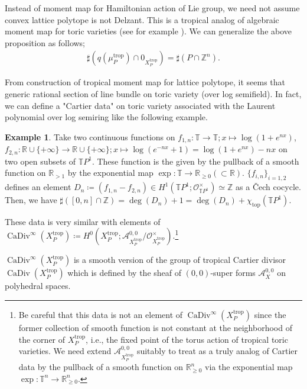 \documentclass[a4paper,dvipdfmx,reqno,12pt]{amsart}
\theoremstyle{definition}
\newtheorem{Eg}[Thm]{Example}
\newcommand{\deq}{\coloneqq}
\newcommand{\R}{\mathbb{R}}%
\newcommand{\Z}{\mathbb{Z}}%
\newcommand{\mb}[1]{\mathbb{#1}}%
\newcommand{\mcal}[1]{\mathcal{#1}}%
\newcommand{\opn}[1]{\operatorname{#1}}
\numberwithin{equation}{section}
\begin{document}
Instead of moment map for Hamiltonian action of Lie group, we
need not assume convex lattice polytope is not Delzant.
This is a tropical analog of algebraic moment map 
for toric varieties
(see for example
\cite[]{coxToricVarieties2011a}).
We can generalize the above proposition as follows;
\begin{align}
\sharp (q(\mu_P^{\opn{trop}}) \cap 0_{X_P^{\opn{trop}}})
=\sharp (P \cap \Z^{n}).
\end{align}

From construction of tropical moment map for lattice polytope,
it seems that generic rational section of line bundle on 
toric variety (over log semifield).
In fact, we can define a "Cartier data" on toric variety
associated with the Laurent polynomial over log semiring like 
the following example. 
\begin{Eg} \label{eg: TP1Cartier}
Take two continuous functions on 
$f_{1,n}\colon \mb{T}\to \mb{T};x \mapsto \log (1+e^{nx})$,
$f_{2,n}\colon \mb{R}\cup\{+\infty\}\to \mb{R}\cup\{+\infty\};
x\mapsto \log(e^{-nx}+1)=\log(1+e^{nx})-nx$ on two open 
subsets of $\mb{T}P^{1}$. These function is the given 
by the pullback of a smooth function on $\R_{>1}$ by the 
exponential map $\opn{exp}:\mb{T}\to \R_{\geq 0} (\subset \R)$.
$\{f_{i,n}\}_{i=1,2}$ defines an element 
$D_n\deq (f_{1,n}-f_{2,n})\in 
H^{1}(\mb{T}P^1;\mcal{O}_{\mb{T}P^1}^{\times})\simeq \Z$
as a \v{C}ech cocycle.
Then, we have 
$\sharp([0,n]\cap \Z)=\opn{deg}(D_n)+1=\opn{deg}(D_n)+\chi_{\opn{top}}(\mb{T}P^1)$.
\end{Eg}


These data is very similar with elements of 
$\opn{CaDiv}^{\infty}(X_{P}^{\opn{trop}})\deq H^{0}(X_{P}^{\opn{trop}};
\mcal{A}^{0,0}_{X_{P}^{\opn{trop}}}/
\mathcal{O}^{\times}_{X_{P}^{\opn{trop}}})$.\footnote{
Be careful that this data is not an element
of $\opn{CaDiv}^{\infty}(X_{P}^{\opn{trop}})$ since
 the former collection of smooth function is not constant
at the neighborhood of the corner of $X_{P}^{\opn{trop}}$,
i.e., the fixed point of the torus action of tropical 
toric varieties.
We need extend $\mcal{A}^{0,0}_{X_{P}^{\opn{trop}}}$
suitably to treat as a truly analog of Cartier data by
the pullback of a smooth function on $\R_{\geq 0}^{n}$ via 
the exponential map $\opn{exp}\colon \mb{T}^{n}\to \R_{\geq 0}^{n}$.}



$\opn{CaDiv}^{\infty}(X_{P}^{\opn{trop}})$ is a
smooth version of the group of tropical Cartier divisor
$\opn{CaDiv}(X_{P}^{\opn{trop}})$ 
\cite[Definition 4.2]{jellLefschetzTheoremTropical2018a}
which is defined by the sheaf of $(0,0)$-super forms 
$\mcal{A}^{0,0}_X$ on 
polyhedral spaces.
\end{document}
